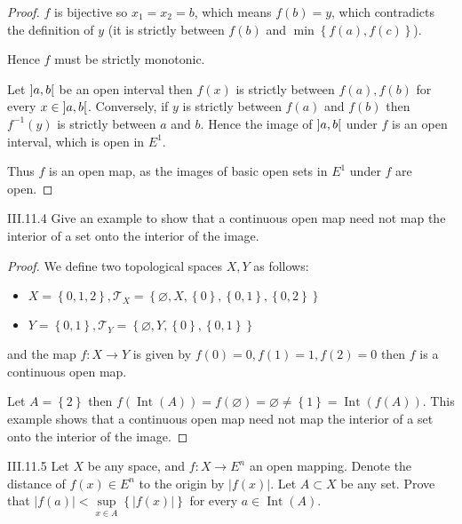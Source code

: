 \begin{proof}
    \( f \) is bijective so \( x_{1} = x_{2} = b \), which means \( f(b) = y \), which contradicts the definition of \( y \) (it is strictly between \( f(b) \) and \( \min\left\{ f(a), f(c) \right\} \)).

    Hence \( f \) must be strictly monotonic.

    Let \( \left\rbrack{a, b}\right\lbrack \) be an open interval then \( f(x) \) is strictly between \( f(a), f(b) \) for every \( x \in \left\rbrack{a, b}\right\lbrack \). Conversely, if \( y \) is strictly between  \( f(a) \) and \( f(b) \) then \( f^{-1}(y) \) is strictly between \( a \) and \( b \). Hence the image of \( \left\rbrack{a, b}\right\lbrack \) under \( f \) is an open interval, which is open in \( E^{1} \).

    Thus \( f \) is an open map, as the images of basic open sets in \( E^{1} \) under \( f \) are open.
\end{proof}

\begin{problem}{III.11.4}
Give an example to show that a continuous open map need not map the interior of a set onto the interior of the image.
\end{problem}

\begin{proof}
    We define two topological spaces \( X, Y \) as follows:
    \begin{itemize}
        \item \( X = \left\{ 0, 1, 2 \right\}, \mathscr{T}_{X} = \left\{ \varnothing, X, \left\{ 0 \right\}, \left\{ 0, 1 \right\}, \left\{ 0, 2 \right\} \right\} \)
        \item \( Y = \left\{ 0, 1 \right\}, \mathscr{T}_{Y} = \left\{ \varnothing, Y, \left\{ 0 \right\}, \left\{ 0, 1 \right\} \right\} \)
    \end{itemize}

    and the map \( f: X \to Y \) is given by \( f(0) = 0, f(1) = 1, f(2) = 0 \) then \( f \) is a continuous open map.

    Let \( A = \left\{ 2 \right\} \) then \( f(\operatorname{Int}(A)) = f(\varnothing) = \varnothing \ne \left\{ 1 \right\} = \operatorname{Int}(f(A)) \). This example shows that a continuous open map need not map the interior of a set onto the interior of the image.
\end{proof}

\begin{problem}{III.11.5}
Let \(X\) be any space, and \(f: X \to E^{n}\) an open mapping. Denote the distance of \( f(x) \in E^{n} \) to the origin by \( \left\vert f(x) \right\vert \). Let \( A \subset X \) be any set. Prove that \( \left\vert f(a) \right\vert < \sup\limits_{x\in A}\left\{ \left\vert f(x) \right\vert \right\} \) for every \( a \in \operatorname{Int}(A) \).
\end{problem}

